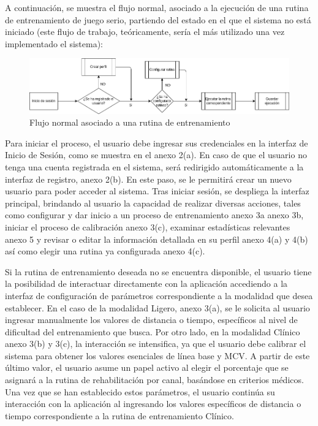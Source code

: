
A continuación, se muestra el flujo normal, asociado a la ejecución de una rutina de entrenamiento de juego serio, partiendo del estado en el que el sistema no está iniciado (este flujo de trabajo, teóricamente, sería el más utilizado una vez implementado el sistema):

\begin{figure}[ht]
    \centering
    \includegraphics[scale=0.5]{images/diagram-flow.png}
    \caption{Flujo normal asociado a una rutina de entrenamiento}
    \label{fig: diagram-flow}
\end{figure}

Para iniciar el proceso, el usuario debe ingresar sus credenciales en la interfaz de Inicio de Sesión, como se muestra en el anexo 2(a). En caso de que el usuario no tenga una cuenta registrada en el sistema, será redirigido automáticamente a la interfaz de registro, anexo 2(b). En este paso, se le permitirá crear un nuevo usuario para poder acceder al sistema. Tras iniciar sesión, se despliega la interfaz principal, brindando al usuario la capacidad de realizar diversas acciones, tales como configurar y dar inicio a un proceso de entrenamiento anexo 3a anexo 3b, iniciar el proceso de calibración anexo 3(c), examinar estadísticas relevantes anexo 5 y revisar o editar la información detallada en su perfil anexo 4(a) y 4(b) así como elegir una rutina ya configurada anexo 4(c).

\vspace{5pt}
Si la rutina de entrenamiento deseada no se encuentra disponible, el usuario tiene la posibilidad de interactuar directamente con la aplicación accediendo a la interfaz de configuración de parámetros correspondiente a la modalidad que desea establecer. En el caso de la modalidad Ligero, anexo 3(a), se le solicita al usuario ingresar manualmente los valores de distancia o tiempo, específicos al nivel de dificultad del entrenamiento que busca. Por otro lado, en la modalidad Clínico anexo 3(b) y 3(c), la interacción se intensifica, ya que el usuario debe calibrar el sistema para obtener los valores esenciales de línea base y MCV. A partir de este último valor, el usuario asume un papel activo al elegir el porcentaje que se asignará a la rutina de rehabilitación por canal, basándose en criterios médicos. Una vez que se han establecido estos parámetros, el usuario continúa su interacción con la aplicación al ingresando los valores específicos de distancia o tiempo correspondiente a la rutina de entrenamiento Clínico. 

